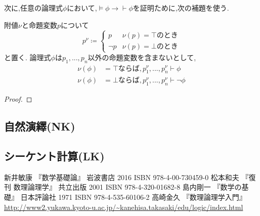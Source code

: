 次に,任意の論理式$\phi$において,$\models \phi \to \vdash \phi$を証明ために,次の補題を使う.
\begin{lemma}
 附値$\nu$と命題変数$p$について
 \begin{equation*}
  p^\nu \coloneqq
	\begin{cases}
	 p & \nu(p) = \top のとき \\
	 \lnot p & \nu(p) = \bot のとき
	\end{cases}
 \end{equation*}
 と置く.
 論理式$\phi$は$p_1,...,p_n$以外の命題変数を含まないとして,
 \begin{align}
  \nu(\phi) &= \top ならば, p_1^{\nu},...,p_n^{\nu} \vdash \phi \\
  \nu(\phi) &= \bot ならば, p_1^{\nu},...,p_n^{\nu} \vdash \lnot \phi
 \end{align}
\end{lemma}

\begin{proof}
 
\end{proof}


\subsection{自然演繹(NK)}

\subsection{シーケント計算(LK)}

\begin{thebibliography}{9}
		新井敏康 『数学基礎論』 岩波書店 2016 ISBN 978-4-00-730459-0
		松本和夫 『復刊 数理論理学』 共立出版 2001 ISBN 978-4-320-01682-8
		島内剛一 『数学の基礎』 日本評論社 1971 ISBN 978-4-535-60106-2
		高崎金久 『数理論理学入門』 \url{http://www2.yukawa.kyoto-u.ac.jp/~kanehisa.takasaki/edu/logic/index.html}
\end{thebibliography}

